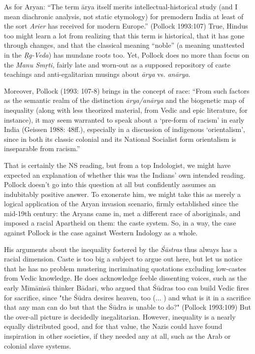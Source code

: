 As for Aryan: “The term ārya itself merits intellectual-historical study (and I mean diachronic analysis, not static etymology) for premodern India at least of the sort {\sl Arier} has received for modern Europe.” (Pollock 1993:107) True, Hindus too might learn a lot from realizing that this term is historical, that it has gone through changes, and that the classical meaning “noble” (a meaning unattested in the {\sl Ŗg-Veda}) has mundane roots too. Yet, Pollock does no more than focus on the {\sl Manu Smṛti,} fairly late and worn-out as a supposed repository of caste teachings and anti-egalitarian musings about {\sl ārya} vs. {\sl anārya}.

Moreover, Pollock (1993: 107-8) brings in the concept of race: 
“From such factors as the semantic realm of the distinction {\sl ārya/anārya} and the biogenetic map of inequality (along with less theorized material, from Vedic and epic literature, for instance), it may seem warranted to speak about a ‘pre-form of racism’ in early India (Geissen 1988: 48ff.), especially in a discussion of indigenous ‘orientalism’, since in both its classic colonial and its National Socialist form orientalism is inseparable from racism.” 

That is certainly the NS reading, but from a top Indologist, we might have expected an explanation of whether this was the Indians’ own intended reading. Pollock doesn’t go into this question at all but confidently assumes an indubitably positive answer. To exonerate him, we might take this as merely a logical application of the Aryan invasion scenario, firmly established since the mid-19th century: the Aryans came in, met a different race of aboriginals, and imposed a racial Apartheid on them: the caste system. So, in a way, the case against Pollock is the case against Western Indology as a whole.

His arguments about the inequality fostered by the {\sl Śāstras} thus always has a racial dimension. Caste is too big a subject to argue out here, but let us notice that he has no problem mustering incriminating quotations excluding low-castes from Vedic knowledge. He does acknowledge feeble dissenting voices, such as the early Mīmāṁsā thinker Bādari, who argued that Śūdras too can build Vedic fires for sacrifice, since "the Śūdra desires heaven, too ($\ldots$ ) and what is it in a sacrifice that any man can do but that the Śūdra is unable to do?" (Pollock 1993:109) But the over-all picture is decidedly inegalitarian. However, inequality is a nearly equally distributed good, and for that value, the Nazis could have found inspiration in other societies, if they needed any at all, such as the Arab or colonial slave systems.

